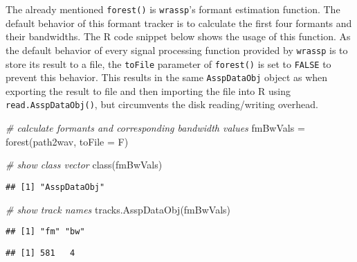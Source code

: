 \documentclass[
]{book}
\newenvironment{Shaded}{\begin{snugshade}}{\end{snugshade}}
\newcommand{\AttributeTok}[1]{\textcolor[rgb]{0.77,0.63,0.00}{#1}}
\newcommand{\CommentTok}[1]{\textcolor[rgb]{0.56,0.35,0.01}{\textit{#1}}}
\newcommand{\FunctionTok}[1]{\textcolor[rgb]{0.00,0.00,0.00}{#1}}
\newcommand{\NormalTok}[1]{#1}
\newcommand{\OtherTok}[1]{\textcolor[rgb]{0.56,0.35,0.01}{#1}}
\newcommand{\SpecialCharTok}[1]{\textcolor[rgb]{0.00,0.00,0.00}{#1}}
\begin{document}
The already mentioned \texttt{forest()} is \texttt{wrassp}'s formant estimation function. The default behavior of this formant tracker is to calculate the first four formants and their bandwidths. The R code snippet below shows the usage of this function. As the default behavior of every signal processing function provided by \texttt{wrassp} is to store its result to a file, the \texttt{toFile} parameter of \texttt{forest()} is set to \texttt{FALSE} to prevent this behavior. This results in the same \texttt{AsspDataObj} object as when exporting the result to file and then importing the file into R using \texttt{read.AsspDataObj()}, but circumvents the disk reading/writing overhead.

\begin{Shaded}
\begin{Highlighting}[]
\CommentTok{\# calculate formants and corresponding bandwidth values}
\NormalTok{fmBwVals }\OtherTok{=} \FunctionTok{forest}\NormalTok{(path2wav, }\AttributeTok{toFile =}\NormalTok{ F)}

\CommentTok{\# show class vector}
\FunctionTok{class}\NormalTok{(fmBwVals)}
\end{Highlighting}
\end{Shaded}

\begin{verbatim}
## [1] "AsspDataObj"
\end{verbatim}

\begin{Shaded}
\begin{Highlighting}[]
\CommentTok{\# show track names}
\FunctionTok{tracks.AsspDataObj}\NormalTok{(fmBwVals)}
\end{Highlighting}
\end{Shaded}

\begin{verbatim}
## [1] "fm" "bw"
\end{verbatim}

\begin{Shaded}
\end{Shaded}

\begin{verbatim}
## [1] 581   4
\end{verbatim}

\begin{Shaded}
\end{Shaded}
\end{document}
